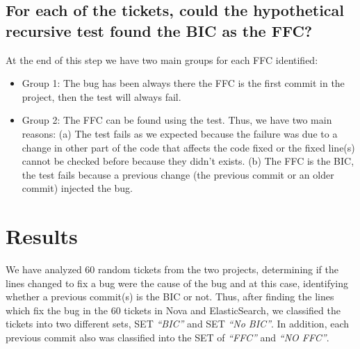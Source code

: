 \documentclass[conference]{IEEEtran}
\begin{document}
%


\subsection{For each of the tickets, could the hypothetical recursive test found the BIC as the FFC?}

At the end of this step we have two main groups for each FFC identified:
\begin{itemize}
	\item Group 1: The bug has been always there the FFC is the first commit in the project, then the test will always fail.
	\item Group 2: The FFC can be found using the test. Thus, we have two main reasons: (a) The test fails as we expected because the failure was due to a change in other part of the code that affects the code fixed or the fixed line(s) cannot be checked before because they didn't exists. (b) The FFC is the BIC, the test fails because a previous change (the previous commit or an older commit) injected the bug.
\end{itemize}

\section{Results}
\label{sec:results}
We have analyzed 60 random tickets from the two projects, determining if the lines changed to fix a bug were the cause of the bug and at this case, identifying whether a previous commit(s) is the BIC or not. Thus, after finding the lines which fix the bug in the 60 tickets in Nova and ElasticSearch, we classified the tickets into two different sets, SET \textit{``BIC''} and SET \textit{``No BIC''}. In addition, each previous commit also was classified into the SET of \textit{``FFC''} and \textit{``NO FFC''}.
\end{document}

